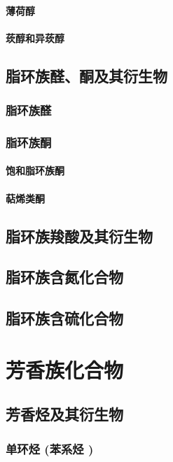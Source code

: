 \documentclass[UTF8]{../03-Chemistry}
\begin{document}
        \subsubsection{薄荷醇}
        \subsubsection{莰醇和异莰醇}
\section{脂环族醛、酮及其衍生物}
    \subsection{脂环族醛}
    \subsection{脂环族酮}
        \subsubsection{饱和脂环族酮}
        \subsubsection{萜烯类酮}
\section{脂环族羧酸及其衍生物}
\section{脂环族含氮化合物}
\section{脂环族含硫化合物}










\chapter{芳香族化合物}
\section{芳香烃及其衍生物}
    \subsection{单环烃 (苯系烃 )}
\end{document}
